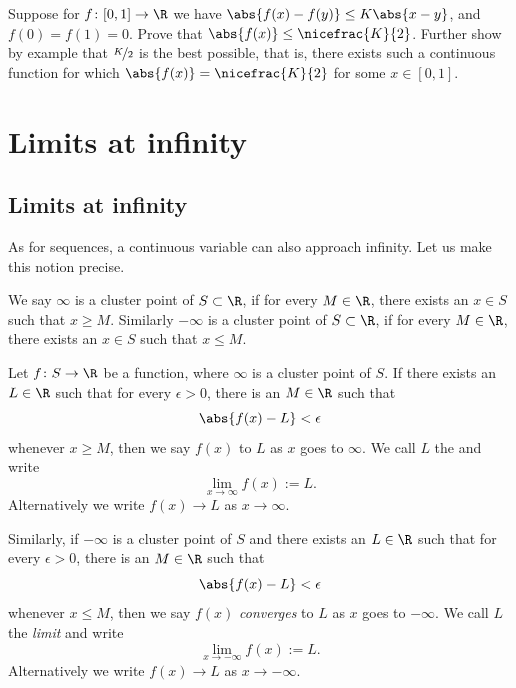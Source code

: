 \documentclass[12pt]{book}
\begin{document}
\begin{exercise}
Suppose for $f \colon [0,1] \to \R$ we have $\abs{f(x)-f(y)} \leq K \abs{x-y}$,
and $f(0) = f(1) = 0$.
Prove that $\abs{f(x)} \leq \nicefrac{K}{2}$.
Further show by example that
$\nicefrac{K}{2}$ is the best possible, that is, there exists such a continuous function
for which $\abs{f(x)} = \nicefrac{K}{2}$ for some $x \in [0,1]$.
\end{exercise}


\sectionnewpage
\section{Limits at infinity}
\label{sec:limitatinf}


\subsection*{Limits at infinity}

As for sequences, a continuous variable can also approach infinity.
Let us make this notion precise.

\begin{defn}
We say $\infty$ is a cluster point of $S \subset \R$, if for every
$M \in \R$, there exists an $x \in S$ such that $x \geq M$.
Similarly
$- \infty$ is a cluster point of $S \subset \R$, if for every
$M \in \R$, there exists an $x \in S$ such that $x \leq M$.

%
Let $f \colon S \to \R$ be a function, where 
$\infty$ is a cluster point of $S$.
If there exists an $L \in \R$
such that for every $\epsilon > 0$, there is an $M \in \R$ such that
\begin{equation*}
\abs{f(x) - L} < \epsilon 
\end{equation*}
whenever $x \geq M$, then we say $f(x)$ \emph{} to $L$
as $x$ goes to $\infty$.
We call $L$ the \emph{} and write
\begin{equation*}
\lim_{x \to \infty} f(x) := L .
\end{equation*}
Alternatively we write $f(x) \to L$ as $x \to \infty$.

Similarly, if $-\infty$ is a cluster point of $S$
and
there exists an $L \in \R$
such that for every $\epsilon > 0$, there is an $M \in \R$ such that
\begin{equation*}
\abs{f(x) - L} < \epsilon 
\end{equation*}
whenever $x \leq M$, then we say $f(x)$ \emph{converges} to $L$
as $x$ goes to $-\infty$.
We call $L$ the \emph{limit} and write
\begin{equation*}
\lim_{x \to -\infty} f(x) := L .
\end{equation*}
Alternatively we write $f(x) \to L$ as $x \to -\infty$.
\end{defn}
\end{document}
